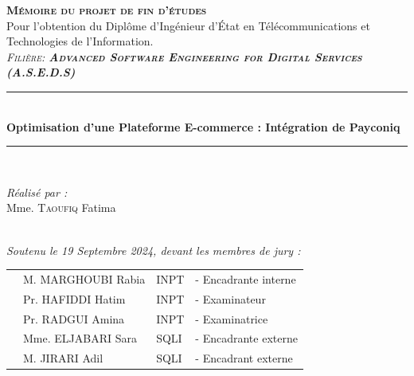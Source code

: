 \vspace{0.4cm}
\begin{center}
{\large \textsc{\textbf{Mémoire du projet de fin d'études}}}\\[0.1cm]
{\large {Pour l’obtention du Diplôme d’Ingénieur d’État en Télécommunications 
et Technologies de l’Information.}}\\[0.1cm]
{\large \textsc{\textit{Filière:\textbf{ Advanced Software Engineering for Digital Services (A.S.E.D.S)}}}} \\[0.05cm] 
\vspace{0.4cm}
\vspace{-0.04cm}
\rule{\linewidth}{0.3mm} \\[0.3cm]   %
 { \huge \textbf{Optimisation d'une Plateforme E-commerce : Intégration de Payconiq}} \\[0.15cm] 
\rule{\linewidth}{0.3mm} \\[0.3cm]



\vspace{0.8cm}

\noindent
\begin{minipage}{0.9\textwidth}
    \vspace{-7mm}
  \begin{flushleft} \large
    \emph{Réalisé par :}\\
    Mme. \textsc{Taoufiq} Fatima %
  \end{flushleft}
\end{minipage}
\begin{minipage}{0.4\textwidth}

\end{minipage}\\[0.3cm]

{\large \textit{Soutenu le 19 Septembre 2024, devant les membres de jury : }}\\[0.3cm]


\begin{tabular}{p{1cm}lll}
  & \large M. MARGHOUBI Rabia & \large INPT & \large - Encadrante interne  \\[0.1cm]
  & \large Pr. HAFIDDI Hatim & \large INPT & \large - Examinateur \\[0.1cm]
  & \large Pr. RADGUI Amina & \large INPT & \large - Examinatrice  \\[0.1cm]
  & \large Mme. ELJABARI Sara & \large SQLI & \large - Encadrante externe  \\[0.1cm]
  & \large M. JIRARI Adil & \large SQLI & \large - Encadrant externe  \\[0.1cm]



\end{tabular}
\end{center}
